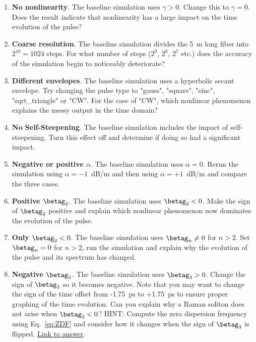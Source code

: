 \begin{enumerate}

\item \textbf{No nonlinearity}. The baseline simulation uses $\gamma>0$. Change this to $\gamma=0$. Does the result indicate that nonlinearity has a large impact on the time evolution of the pulse?

\item \textbf{Coarse resolution}. The baseline simulation divides the 5~m long fiber into $2^{10}=1024$ steps. For what number of steps ($2^{9}$, $2^{8}$, $2^{7}$ etc.) does the accuracy of the simulation begin to noticeably deteriorate?

\item \textbf{Different envelopes}. The baseline simulation uses a hyperbolic secant envelope. Try changing the pulse type to "gauss", "square", "sinc", "sqrt\_triangle" or "CW". For the case of "CW", which nonlinear phenomenon explains the messy output in the time domain?  

\item \textbf{No Self-Steepening}. The baseline simulation includes the impact of self-steepening. Turn this effect off and determine if doing so had a significant impact.

\item \textbf{Negative or positive $\alpha$}. The baseline simulation uses $\alpha=0$. Rerun the simulation using $\alpha=-1$~dB/m and then using $\alpha=+1$~dB/m and compare the three cases.   



\item \textbf{Positive $\betag_2$}. The baseline simulation uses $\betag_2<0$. Make the sign of $\betag_2$ positive and explain which nonlinear phenomenon now dominates the evolution of the pulse. 

 


\item \textbf{Only $\betag_2<0$}. The baseline simulation uses $\betag_n\neq0$ for $n>2$. Set $\betag_n = 0$ for $n>2$, run the simulation and explain why the evolution of the pulse and its spectrum has changed. 

\item \textbf{Negative $\betag_3$}. The baseline simulation uses $\betag_3>0$. Change the sign of $\betag_3$ so it becomes negative. Note that you may want to change the sign of the time offset from -1.75~ps to +1.75~ps to ensure proper graphing of the time evolution. Can you explain why a Raman soliton does not arise when $\betag_3<0$? HINT: Compute the zero dispersion frequency using Eq.~\ref{eq:ZDF} and consider how it changes when the sign of $\betag_3$ is flipped. \href{https://github.com/OleKrarup123/NLSE-primer/issues/2}{Link to answer}.



\end{enumerate}
